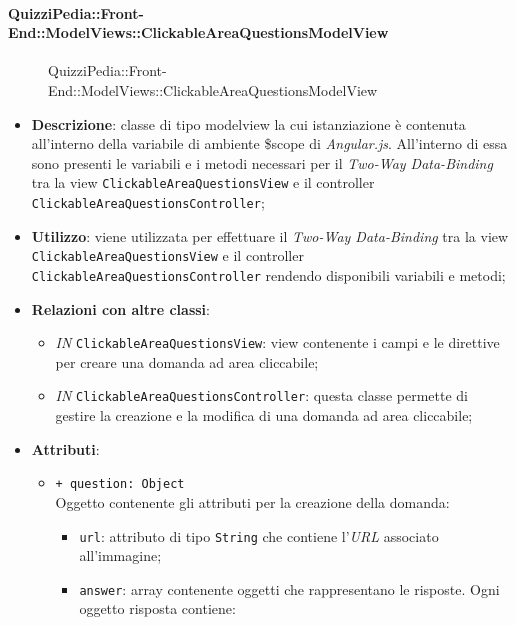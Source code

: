 \paragraph{QuizziPedia::Front-End::ModelViews::ClickableAreaQuestionsModelView}
\begin{figure} [ht]
	\centering
	\caption{QuizziPedia::Front-End::ModelViews::ClickableAreaQuestionsModelView}
\end{figure} \FloatBarrier
\begin{itemize}
	\item \textbf{Descrizione}: classe di tipo modelview la cui istanziazione è contenuta all'interno della variabile di ambiente \$scope di \textit{Angular.js}. All'interno di essa sono presenti le variabili e i metodi necessari per il \textit{Two-Way Data-Binding} tra la view \texttt{ClickableAreaQuestionsView} e il controller \texttt{ClickableAreaQuestionsController}; 
	\item \textbf{Utilizzo}: viene utilizzata per effettuare il \textit{Two-Way Data-Binding} tra la view \texttt{ClickableAreaQuestionsView} e il controller \texttt{ClickableAreaQuestionsController} rendendo disponibili variabili e metodi;
	\item \textbf{Relazioni con altre classi}:
	\begin{itemize}
		\item \textit{IN} \texttt{ClickableAreaQuestionsView}: view contenente i campi e le direttive per creare una domanda ad area cliccabile; 
		\item \textit{IN} \texttt{ClickableAreaQuestionsController}: questa classe permette di gestire la creazione e la modifica di una domanda ad area cliccabile;
	\end{itemize}
	\item \textbf{Attributi}:
	\begin{itemize}
			\item \texttt{+ question: Object} \\ Oggetto contenente gli attributi per la creazione della domanda:
			\begin{itemize}
				\item \texttt{url}: attributo di tipo \texttt{String} che contiene l'\textit{URL} associato all'immagine;
				\item \texttt{answer}: array contenente oggetti che rappresentano le risposte. Ogni oggetto risposta contiene:
				\begin{itemize}

\end{itemize}
\end{itemize}
\end{itemize}
\end{itemize}
